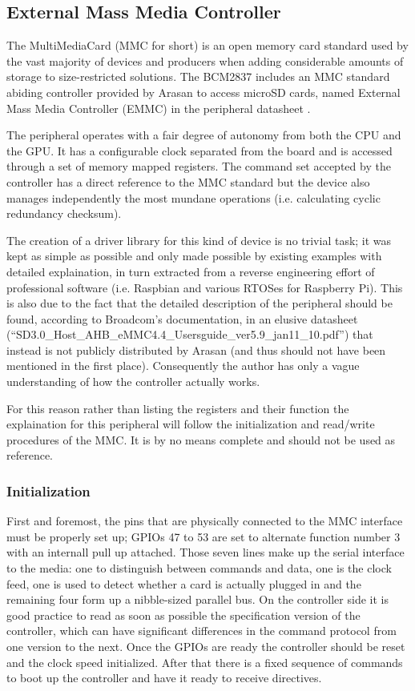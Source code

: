 \documentclass[12pt,a4paper,openright,twoside]{report}
\begin{document}
\subsection{External Mass Media Controller}
\label{emmc}
The MultiMediaCard (MMC for short) is an open memory card standard used by the
vast majority of devices and producers when adding considerable amounts of 
storage to size-restricted solutions. The BCM2837 includes an MMC standard abiding
controller provided by Arasan to access microSD cards, named External Mass Media Controller (EMMC)
in the peripheral datasheet \cite{bcm2835}.

The peripheral operates with a fair degree of autonomy from both the CPU and
the GPU. It has a configurable clock separated from the board and is accessed
through a set of memory mapped registers. The command set accepted by the controller
has a direct reference to the MMC standard but the device also manages independently
the most mundane operations (i.e. calculating cyclic redundancy checksum).

The creation of a driver library for this kind of device is no trivial task; it 
was kept as simple as possible and only made possible by existing examples
with detailed explaination, in turn extracted from a reverse engineering effort
of professional software (i.e. Raspbian and various RTOSes for Raspberry Pi).
This is also due to the fact that the detailed description of the peripheral 
should be found, according to Broadcom's documentation, in an elusive datasheet 
(``SD3.0\_Host\_AHB\_eMMC4.4\_Usersguide\_ver5.9\_jan11\_10.pdf'') that instead is 
not publicly distributed by Arasan (and thus should not have been mentioned in 
the first place). Consequently the author has only a vague understanding of 
how the controller actually works.

For this reason rather than listing the registers and their function the explaination
for this peripheral will follow the initialization and read/write procedures 
of the MMC. It is by no means complete and should not be used as reference.

\subsubsection{Initialization}
First and foremost, the pins that are physically connected to the MMC interface
must be properly set up; GPIOs 47 to 53 are set to alternate function number 3
with an internall pull up attached. Those seven lines make up the serial interface
to the media: one to distinguish between commands and data, one is the clock feed,
one is used to detect whether a card is actually plugged in and the remaining four
form up a nibble-sized parallel bus.
On the controller side it is good practice to read as soon as possible the specification
version of the controller, which can have significant differences in the command
 protocol from one version to the next.
Once the GPIOs are ready the controller should be reset and the clock speed initialized.
After that there is a fixed sequence of commands to boot up the controller and
have it ready to receive directives.
\end{document}
